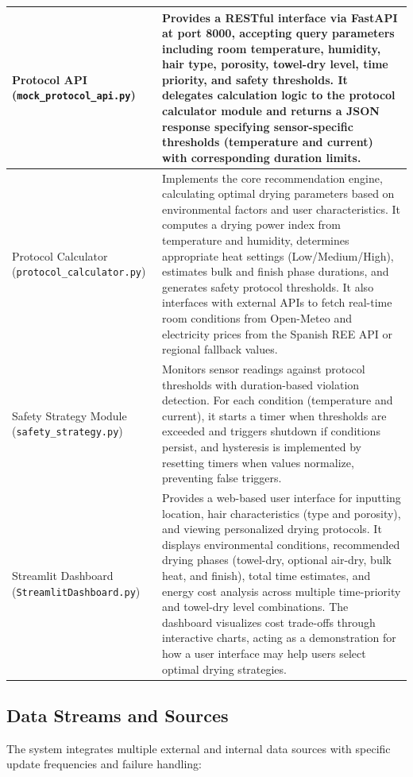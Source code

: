 \documentclass[11pt,a4paper]{article}
\begin{document}
\begin{longtable}{|L{0.3\textwidth}|p{0.65\textwidth}|}
\hline
Protocol API (\texttt{mock\_protocol\_api.py}) & Provides a RESTful interface via FastAPI at port 8000, accepting query parameters including room temperature, humidity, hair type, porosity, towel-dry level, time priority, and safety thresholds. It delegates calculation logic to the protocol calculator module and returns a JSON response specifying sensor-specific thresholds (temperature and current) with corresponding duration limits. \\
\hline
Protocol Calculator (\texttt{protocol\_calculator.py}) & Implements the core recommendation engine, calculating optimal drying parameters based on environmental factors and user characteristics. It computes a drying power index from temperature and humidity, determines appropriate heat settings (Low/Medium/High), estimates bulk and finish phase durations, and generates safety protocol thresholds. It also interfaces with external APIs to fetch real-time room conditions from Open-Meteo and electricity prices from the Spanish REE API or regional fallback values. \\
\hline
Safety Strategy Module (\texttt{safety\_strategy.py}) & Monitors sensor readings against protocol thresholds with duration-based violation detection. For each condition (temperature and current), it starts a timer when thresholds are exceeded and triggers shutdown if conditions persist, and hysteresis is implemented by resetting timers when values normalize, preventing false triggers. \\
\hline
Streamlit Dashboard (\texttt{StreamlitDashboard.py}) & Provides a web-based user interface for inputting location, hair characteristics (type and porosity), and viewing personalized drying protocols. It displays environmental conditions, recommended drying phases (towel-dry, optional air-dry, bulk heat, and finish), total time estimates, and energy cost analysis across multiple time-priority and towel-dry level combinations. The dashboard visualizes cost trade-offs through interactive charts, acting as a demonstration for how a user interface may help users select optimal drying strategies. \\
\hline
\end{longtable}

\subsection{Data Streams and Sources}

The system integrates multiple external and internal data sources with specific update frequencies and failure handling:
\end{document}
